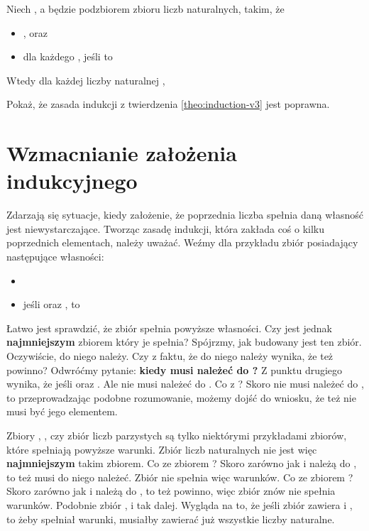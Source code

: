 \begin{theo}
Niech , a  będzie podzbiorem zbioru liczb naturalnych, takim, że 
\begin{itemize}
    \item {}, oraz
    \item dla każdego , jeśli  to 
\end{itemize}
Wtedy dla każdej liczby naturalnej , 
\label{theo:induction-v3}
\end{theo}

\begin{ex}
Pokaż, że zasada indukcji z twierdzenia \ref{theo:induction-v3} jest poprawna.
\end{ex}

\section{Wzmacnianie założenia indukcyjnego}

Zdarzają się sytuacje, kiedy założenie, że poprzednia liczba spełnia daną własność jest niewystarczające. Tworząc zasadę indukcji, która zakłada coś o kilku poprzednich elementach, należy uważać. Weźmy dla przykładu zbiór  posiadający następujące własności:

\begin{itemize}
    \item {}
    \item jeśli  oraz , to  
\end{itemize}

Łatwo jest sprawdzić, że zbiór  spełnia powyższe własności. Czy jest jednak \textbf{najmniejszym} zbiorem który je spełnia? Spójrzmy, jak budowany jest ten zbiór. Oczywiście,  do niego należy. Czy z faktu, że  do niego należy wynika, że  też powinno? Odwróćmy pytanie: \textbf{kiedy  musi należeć do ?} Z punktu drugiego wynika, że  jeśli  oraz . Ale  nie musi należeć do . Co z ? Skoro  nie musi należeć do , to przeprowadzając podobne rozumowanie, możemy dojść do wniosku, że  też nie musi być jego elementem.

Zbiory , , czy zbiór liczb parzystych są tylko niektórymi przykładami zbiorów, które spełniają powyższe warunki. Zbiór liczb naturalnych nie jest więc \textbf{najmniejszym} takim zbiorem. Co ze zbiorem ? Skoro zarówno  jak i  należą do , to  też musi do niego należeć. Zbiór  nie spełnia więc warunków. Co ze zbiorem ? Skoro zarówno  jak i  należą do , to  też powinno, więc zbiór  znów nie spełnia warunków. Podobnie zbiór ,  i tak dalej. Wygląda na to, że jeśli zbiór zawiera  i , to żeby spełniał warunki, musiałby zawierać już wszystkie liczby naturalne.

